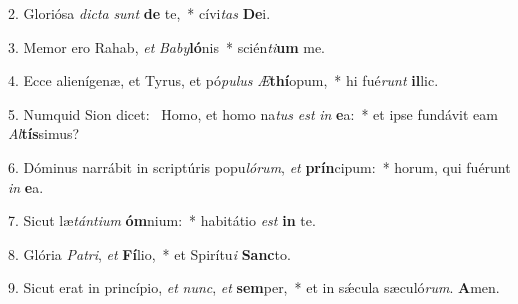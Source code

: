 2. Gloriósa \textit{dic}\textit{ta} \textit{sunt} \textbf{de} te,~*  cívi\textit{tas} \textbf{De}i.\

3. Memor ero Rahab, \textit{et} \textit{Ba}\textit{by}\textbf{ló}nis~*  scién\textit{ti}\textbf{um} me.\

4. Ecce alienígenæ, et Tyrus, et pó\textit{pu}\textit{lus} \textit{Æ}\textbf{thí}opum,~*  hi fué\textit{runt} \textbf{il}lic.\

5. Numquid Sion dicet: \dag\  Homo, et homo na\textit{tus} \textit{est} \textit{in} \textbf{e}a:~*  et ipse fundávit eam \textit{Al}\textbf{tís}simus?\

6. Dóminus narrábit in scriptúris popu\textit{ló}\textit{rum}, \textit{et} \textbf{prín}cipum:~*  horum, qui fuérunt \textit{in} \textbf{e}a.\

7. Sicut læ\textit{tán}\textit{ti}\textit{um} \textbf{óm}nium:~*  habitátio \textit{est} \textbf{in} te.\

8. Glória \textit{Pa}\textit{tri}, \textit{et} \textbf{Fí}lio,~*  et Spirítu\textit{i} \textbf{Sanc}to.\

9. Sicut erat in princípio, \textit{et} \textit{nunc}, \textit{et} \textbf{sem}per,~*  et in sǽcula sæculó\textit{rum}. \textbf{A}men.\

